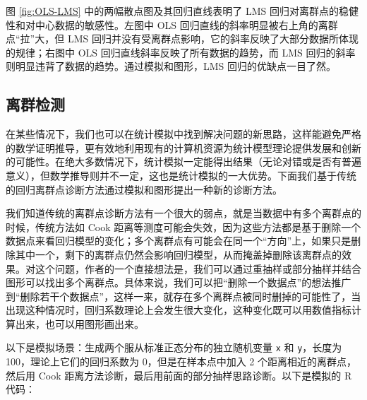 \documentclass[
  b5paper,
  UTF8,twoside]{book}
\begin{document}
图 \ref{fig:OLS-LMS} 中的两幅散点图及其回归直线表明了 LMS 回归对离群点的稳健性和对中心数据的敏感性。左图中 OLS 回归直线的斜率明显被右上角的离群点``拉''大，但 LMS 回归并没有受离群点影响，它的斜率反映了大部分数据所体现的规律；右图中 OLS 回归直线斜率反映了所有数据的趋势，而 LMS 回归的斜率则明显违背了数据的趋势。通过模拟和图形，LMS 回归的优缺点一目了然。

\subsection{离群检测}\label{ux79bbux7fa4ux68c0ux6d4b}

在某些情况下，我们也可以在统计模拟中找到解决问题的新思路，这样能避免严格的数学证明推导，更有效地利用现有的计算机资源为统计模型理论提供发展和创新的可能性。在绝大多数情况下，统计模拟一定能得出结果（无论对错或是否有普遍意义），但数学推导则并不一定，这也是统计模拟的一大优势。下面我们基于传统的回归离群点诊断方法通过模拟和图形提出一种新的诊断方法。

我们知道传统的离群点诊断方法有一个很大的弱点，就是当数据中有多个离群点的时候，传统方法如 Cook 距离等测度可能会失效，因为这些方法都是基于删除一个数据点来看回归模型的变化；多个离群点有可能会在同一个``方向''上，如果只是删除其中一个，剩下的离群点仍然会影响回归模型，从而掩盖掉删除该离群点的效果。对这个问题，作者的一个直接想法是，我们可以通过重抽样或部分抽样并结合图形可以找出多个离群点。具体来说，我们可以把``删除一个数据点''的想法推广到``删除若干个数据点''，这样一来，就存在多个离群点被同时删掉的可能性了，当出现这种情况时，回归系数理论上会发生很大变化，这种变化既可以用数值指标计算出来，也可以用图形画出来。

以下是模拟场景：生成两个服从标准正态分布的独立随机变量 \texttt{x} 和 \texttt{y}，长度为 100，理论上它们的回归系数为 0，但是在样本点中加入 2 个距离相近的离群点，然后用 Cook 距离方法诊断，最后用前面的部分抽样思路诊断。以下是模拟的 R 代码：
\end{document}
